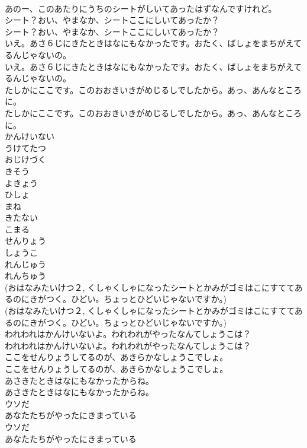 \documentclass[8pt]{extreport}
\begin{document}
\begin{CJK}{UTF8}{min}
\\	あのー、このあたりにうちのシートがしいてあったはずなんですけれど。
\\	シート？おい、やまなか、シートここにしいてあったか？
\\	シート？おい、やまなか、シートここにしいてあったか？
\\	いえ。あさ６じにきたときはなにもなかったです。おたく、ばしょをまちがえてるんじゃないの。
\\	いえ。あさ６じにきたときはなにもなかったです。おたく、ばしょをまちがえてるんじゃないの。
\\	たしかにここです。このおおきいきがめじるしでしたから。あっ、あんなところに。
\\	たしかにここです。このおおきいきがめじるしでしたから。あっ、あんなところに。
\\	かんけいない
\\	うけてたつ
\\	おじけづく
\\	きそう
\\	よきょう
\\	ひしょ
\\	まね
\\	きたない
\\	こまる
\\	せんりょう
\\	しょうこ
\\	れんじゅう 
\\	れんちゅう
\\	(おはなみたいけつ２, くしゃくしゃになったシートとかみがゴミはこにすててあるのにきがつく。ひどい。ちょっとひどいじゃないですか。)
\\	(おはなみたいけつ２, くしゃくしゃになったシートとかみがゴミはこにすててあるのにきがつく。ひどい。ちょっとひどいじゃないですか。)
\\	われわれはかんけいないよ。われわれがやったなんてしょうこは？
\\	われわれはかんけいないよ。われわれがやったなんてしょうこは？
\\	ここをせんりょうしてるのが、あきらかなしょうこでしょ。
\\	ここをせんりょうしてるのが、あきらかなしょうこでしょ。
\\	あさきたときはなにもなかったからね。
\\	あさきたときはなにもなかったからね。
\\	ウソだ
\\	あなたたちがやったにきまっている
\\	ウソだ
\\	あなたたちがやったにきまっている

\end{CJK}
\end{document}
